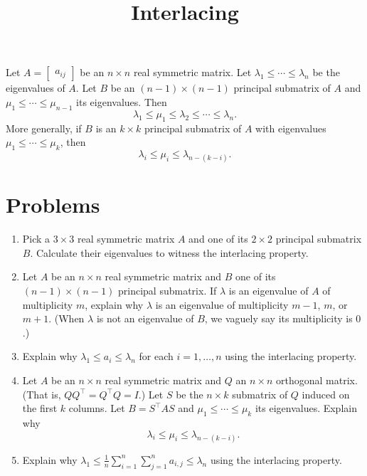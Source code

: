 \documentclass{article}
\title{Interlacing}
\date{\vspace{-1cm}}
\newcommand{\trans}{^\top}
\theoremstyle{definition}
\begin{document}
\maketitle
\large

Let $A = \begin{bmatrix} a_{ij} \end{bmatrix}$ be an $n\times n$ real symmetric matrix.  Let $\lambda_1 \leq \cdots \leq \lambda_n$ be the eigenvalues of $A$.  Let $B$ be an $(n-1)\times (n-1)$ principal submatrix of $A$ and $\mu_1 \leq \cdots \leq \mu_{n-1}$ its eigenvalues.  Then 
\[\lambda_1 \leq \mu_1 \leq \lambda_2 \leq \cdots \leq \lambda_n.\]
More generally, if $B$ is an $k\times k$ principal submatrix of $A$ with eigenvalues $\mu_1 \leq \cdots \leq \mu_k$, then 
\[\lambda_i \leq \mu_i \leq \lambda_{n - (k-i)}.\]
  
\section*{Problems}
\begin{enumerate}
\setlength\itemsep{2em}
\item Pick a $3\times 3$ real symmetric matrix $A$ and one of its $2\times 2$ principal submatrix $B$.  Calculate their eigenvalues to witness the interlacing property.
\item Let $A$ be an $n\times n$ real symmetric matrix and $B$ one of its $(n-1)\times (n-1)$ principal submatrix.  If $\lambda$ is an eigenvalue of $A$ of multiplicity $m$, explain why $\lambda$ is an eigenvalue of multiplicity $m-1$, $m$, or $m+1$.  (When $\lambda$ is not an eigenvalue of $B$, we vaguely say its multiplicity is $0$.) 
\item Explain why $\lambda_1 \leq a_i \leq \lambda_n$ for each $i = 1,\ldots, n$ using the interlacing property.
\item Let $A$ be an $n\times n$ real symmetric matrix and $Q$ an $n\times n$ orthogonal matrix.  (That is, $QQ\trans = Q\trans Q = I$.)  Let $S$ be the $n\times k$ submatrix of $Q$ induced on the first $k$ columns.  Let $B = S\trans AS$ and $\mu_1 \leq \cdots \leq \mu_k$ its eigenvalues.  Explain why 
\[\lambda_i \leq \mu_i \leq \lambda_{n - (k-i)}.\]
\item Explain why $\lambda_1 \leq \frac{1}{n}\sum_{i=1}^n\sum_{j=1}^n a_{i,j} \leq \lambda_n$ using the interlacing property.
\end{enumerate}

\end{document}
